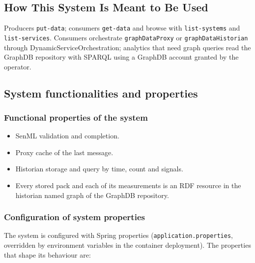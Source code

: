 \documentclass[a4paper]{arrowhead}
\begin{document}
\subsection{How This System Is Meant to Be Used}
\label{sec:use}

Producers \texttt{put-\allowbreak{}data}; consumers \texttt{get-\allowbreak{}data} and browse with \texttt{list-\allowbreak{}systems} and \texttt{list-\allowbreak{}services}. Consumers orchestrate \texttt{graphDataProxy} or \texttt{graphDataHistorian} through DynamicServiceOrchestration; analytics that need graph queries read the GraphDB repository with SPARQL using a GraphDB account granted by the operator.

\subsection{System functionalities and properties}
\label{sec:properties}

\subsubsection{Functional properties of the system}

\begin{itemize}
  \item SenML validation and completion.
  \item Proxy cache of the last message.
  \item Historian storage and query by time, count and signals.
  \item Every stored pack and each of its measurements is an RDF resource in the historian named graph of the GraphDB repository.
\end{itemize}

\subsubsection{Configuration of system properties}

The system is configured with Spring properties (\texttt{application.properties}, overridden by environment variables in the container deployment). The properties that shape its behaviour are:
\end{document}
